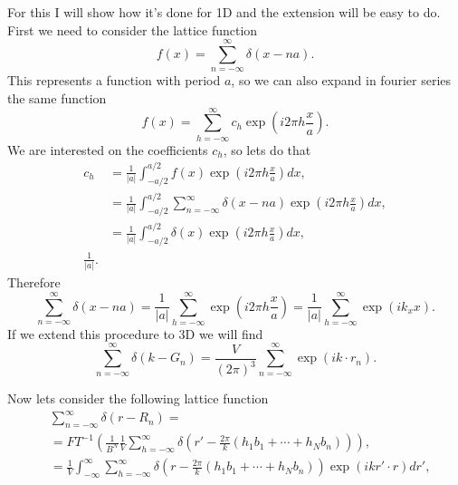 \begin{questions}
\begin{solution}
  For this I will show how it's done for 1D and the extension will be easy to do. First we need to consider the lattice function
  \begin{equation}
    f(x) = \sum_{n=-\infty}^\infty \delta(x-na).
  \end{equation}
  This represents a function with period $a$, so we can also expand in fourier series the same function
  \begin{equation}
    f(x) = \sum_{h=-\infty}^\infty c_h \exp \left(i2\pi h\frac{x}{a}\right).
  \end{equation}
  We are interested on the coefficients $c_h$, so lets do that
  \begin{equation}
    \begin{aligned}
c_h &= \frac{1}{|a|} \int_{-a/2}^{a/2}f(x)\exp\left(i2\pi h\frac{x}{a}\right)dx,\\
&= \frac{1}{|a|} \int_{-a/2}^{a/2}\sum_{n=-\infty}^\infty \delta(x-na)\exp\left(i2\pi h\frac{x}{a}\right)dx,\\
&= \frac{1}{|a|} \int_{-a/2}^{a/2} \delta(x)\exp\left(i2\pi h\frac{x}{a}\right)dx,\\
\frac{1}{|a|}.
    \end{aligned}
  \end{equation}
  Therefore
  \begin{equation}
    \sum_{n=-\infty}^\infty \delta(x-na) = \frac{1}{|a|}\sum_{h=-\infty}^\infty  \exp \left(i2\pi h\frac{x}{a}\right) = \frac{1}{|a|}\sum_{h=-\infty}^\infty  \exp \left(i k_x x\right).
  \end{equation}
  If we extend this procedure to 3D we will find
  \begin{equation}
    \sum_{n=-\infty}^\infty \delta(k-G_n)  = \frac{V}{(2\pi)^3}\sum_{n=-\infty}^\infty  \exp \left(i k\cdot r_n\right).
  \end{equation}
\end{solution}
\begin{solution}
  Now lets consider the following lattice function
  \begin{equation*}
    \begin{aligned}
      &\sum_{n=-\infty}^\infty \delta(r-R_n) = \\
      &= FT^{-1} \left( \frac{1}{B^N}\frac{1}{V} \sum_{h=-\infty}^\infty \delta \left(r' - \frac{2\pi}{k}(h_1b_1+\cdots+ h_Nb_n) \right)\right),\\
      &=\frac{1}{V} \int_{-\infty}^\infty \sum_{h=-\infty}^\infty \delta \left(r - \frac{2\pi}{k}(h_1b_1+\cdots+ h_Nb_n) \right)\exp(ikr'\cdot r)dr',\\

\end{aligned}
\end{equation*}
\end{solution}
\end{questions}
